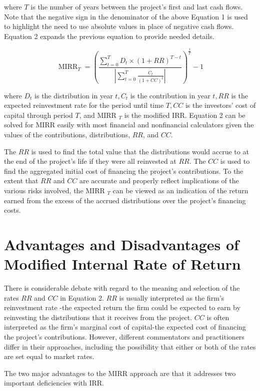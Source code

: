 \documentclass[11pt]{article}
\begin{document}
where $T$ is the number of years between the project's first and last cash flows. Note that the negative sign in the denominator of the above Equation 1 is used to highlight the need to use absolute values in place of negative cash flows. Equation 2 expands the previous equation to provide needed details.


\begin{equation*}
\operatorname{MIRR}_{T}=\left(\frac{\sum_{t=0}^{T} D_{t} \times(1+R R)^{T-t}}{\left|\sum_{t=0}^{T} \frac{C_{t}}{(1+C C)^{t}}\right|}\right)^{\frac{1}{T}}-1 \tag{2}
\end{equation*}


where $D_{t}$ is the distribution in year $t, C_{t}$ is the contribution in year $t, R R$ is the expected reinvestment rate for the period until time $T, C C$ is the investors' cost of capital through period $T$, and MIRR ${ }_{T}$ is the modified IRR. Equation 2 can be solved for MIRR easily with most financial and nonfinancial calculators given the values of the contributions, distributions, $R R$, and $C C$.

The $R R$ is used to find the total value that the distributions would accrue to at the end of the project's life if they were all reinvested at $R R$. The $C C$ is used to find the aggregated initial cost of financing the project's contributions. To the extent that $R R$ and $C C$ are accurate and properly reflect implications of the various risks involved, the MIRR $_{T}$ can be viewed as an indication of the return earned from the excess of the accrued distributions over the project's financing costs.

\section*{Advantages and Disadvantages of Modified Internal Rate of Return}
There is considerable debate with regard to the meaning and selection of the rates $R R$ and $C C$ in Equation 2. $R R$ is usually interpreted as the firm's reinvestment rate -the expected return the firm could be expected to earn by reinvesting the distributions that it receives from the project. $C C$ is often interpreted as the firm's marginal cost of capital-the expected cost of financing the project's contributions. However, different commentators and practitioners differ in their approaches, including the possibility that either or both of the rates are set equal to market rates.

The two major advantages to the MIRR approach are that it addresses two important deficiencies with IRR.
\end{document}
